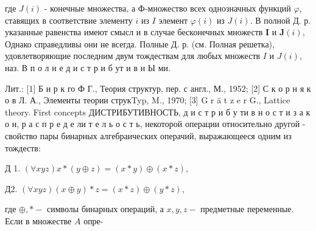 \documentclass[10pt]{article}
\begin{document}
где $J(i)$ - конечные множества, а Ф-множество всех однозначных функций $\varphi$, ставящих в соответствие элементу $i$ из $I$ элемент $\varphi(i)$ из $J(i)$. В полной Д. р. указанные равенства имеют смысл и в случае бесконечных множеств $\boldsymbol{I}$ и $\boldsymbol{J}(i)$, Однако справедливы они не всегда. Полные Д. р. (см. Полная решетка), удовлетворяющие последним двум тождествам для любых множеств $I$ и $J(i)$, наз. В п о л н е д и с т р и б ут и в н Ы ми.



Лит.: [1] Б и р к го Ф Г., Теория структур, пер. с англ., М., 1952; [2] С к о р н я к о в Л. А., Элементы теории струкTyp, M., 1970; [3] G r ä t z e r G., Lattice theory. First concepts ДИСТРИБУТИВНОСТЬ, д и с т р и б у ти в н о с т и з а к о н, р а с п р е д е ли т е л ь о с т ь, некоторой операции относительно другой - свойство пары бинарных алгебраических операчий, выражающееся одним из тождеств:



Д 1. $(\forall x y z) x *(y \oplus z)=(x * y) \oplus(x * z)$,



Д2. $(\forall x y z)(x \oplus y) * z=(x * z) \oplus(y * z)$,



где $\oplus, *-$ символы бинарных операций, а $x, y, z-$ предметные переменные. Если в множестве $A$ опре-
\end{document}
